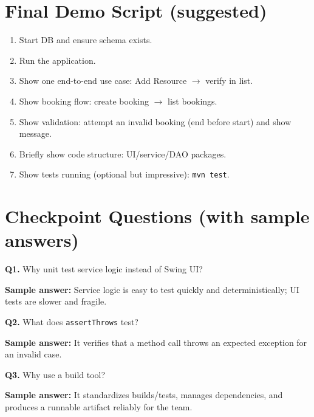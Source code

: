 \documentclass[11pt]{article}
\begin{document}
\section{Final Demo Script (suggested)}
\begin{enumerate}
  \item Start DB and ensure schema exists.
  \item Run the application.
  \item Show one end-to-end use case: Add Resource $\rightarrow$ verify in list.
  \item Show booking flow: create booking $\rightarrow$ list bookings.
  \item Show validation: attempt an invalid booking (end before start) and show message.
  \item Briefly show code structure: UI/service/DAO packages.
  \item Show tests running (optional but impressive): \texttt{mvn test}.
\end{enumerate}

\section{Checkpoint Questions (with sample answers)}
\textbf{Q1.} Why unit test service logic instead of Swing UI?\par
\textbf{Sample answer:} Service logic is easy to test quickly and deterministically; UI tests are slower and fragile.

\vspace{0.6em}
\textbf{Q2.} What does \texttt{assertThrows} test?\par
\textbf{Sample answer:} It verifies that a method call throws an expected exception for an invalid case.

\vspace{0.6em}
\textbf{Q3.} Why use a build tool?\par
\textbf{Sample answer:} It standardizes builds/tests, manages dependencies, and produces a runnable artifact reliably for the team.
\end{document}
